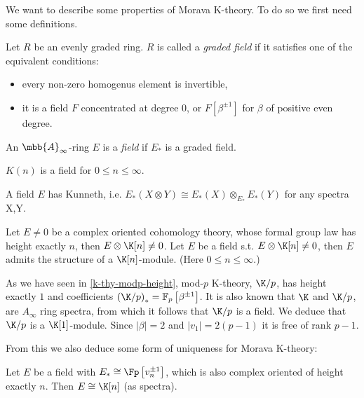 We want to describe some properties of Morava K-theory.
To do so we first need some definitions.

\begin{definition}
	Let $R$ be an evenly graded ring.
	$R$ is called a \emph{graded field} if it satisfies one of the equivalent conditions:
	\begin{itemize}
		\item every non-zero homogenus element is invertible,
		\item it is a field $F$ concentrated at degree 0, or $F\left[\beta^{\pm1}\right]$ for $\beta$ of positive even degree.
	\end{itemize}
	An $\mbb{A}_\infty$-ring $E$ is a \emph{field} if $E_*$ is a graded field.
\end{definition}

\begin{example}
	$K\left(n\right)$ is a field for $0 \leq n \leq \infty$.
\end{example}

\begin{proposition}
	A field $E$ has Kunneth, i.e. $E_*\left(X\otimes Y\right)\cong E_*\left(X\right)\otimes_{E_*}E_*\left(Y\right)$ for any spectra X,Y.
\end{proposition}

\begin{proposition}
	Let $E \neq 0$ be a complex oriented cohomology theory, whose formal group law has height exactly $n$, then $E \otimes \K[n] \neq 0$.
	Let $E$ be a field s.t. $E \otimes \K[n] \neq 0$, then $E$ admits the structure of a $\K[n]$-module.
	(Here $0 \leq n \leq \infty$.)
\end{proposition}

\begin{example}\label{k-thy-modp-morava}
	As we have seen in \ref{k-thy-modp-height}, mod-$p$ K-theory, $\K/p$, has height exactly $1$ and coefficients $\left(\K/p\right)_* = \mathbb{F}_p \left[\beta^{\pm 1}\right]$.
	It is also known that $\K$ and $\K/p$, are $A_\infty$ ring spectra, from which it follows that $\K/p$ is a field.
	We deduce that $\K/p$ is a $\K[1]$-module.
	Since $\left|\beta\right| = 2$ and $\left|v_1\right| = 2\left(p-1\right)$ it is free of rank $p-1$.
\end{example}

From this we also deduce some form of uniqueness for Morava K-theory:

\begin{corollary}
	Let $E$ be a field with $E_* \cong \Fp\left[v_n^{\pm 1}\right]$, which is also complex oriented of height exactly $n$.
	Then $E \cong \K[n]$ (as spectra).
\end{corollary}



